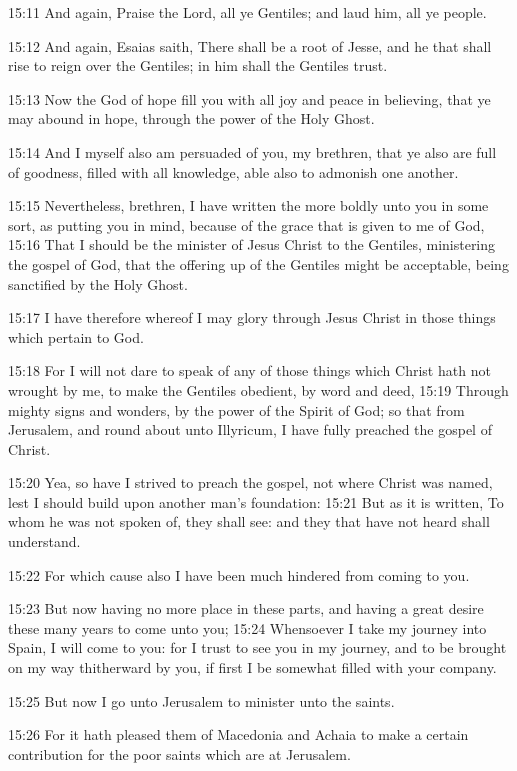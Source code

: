 15:11 And again, Praise the Lord, all ye Gentiles; and laud him, all
ye people.

15:12 And again, Esaias saith, There shall be a root of Jesse, and he
that shall rise to reign over the Gentiles; in him shall the Gentiles
trust.

15:13 Now the God of hope fill you with all joy and peace in
believing, that ye may abound in hope, through the power of the Holy
Ghost.

15:14 And I myself also am persuaded of you, my brethren, that ye also
are full of goodness, filled with all knowledge, able also to admonish
one another.

15:15 Nevertheless, brethren, I have written the more boldly unto you
in some sort, as putting you in mind, because of the grace that is
given to me of God, 15:16 That I should be the minister of Jesus
Christ to the Gentiles, ministering the gospel of God, that the
offering up of the Gentiles might be acceptable, being sanctified by
the Holy Ghost.

15:17 I have therefore whereof I may glory through Jesus Christ in
those things which pertain to God.

15:18 For I will not dare to speak of any of those things which Christ
hath not wrought by me, to make the Gentiles obedient, by word and
deed, 15:19 Through mighty signs and wonders, by the power of the
Spirit of God; so that from Jerusalem, and round about unto Illyricum,
I have fully preached the gospel of Christ.

15:20 Yea, so have I strived to preach the gospel, not where Christ
was named, lest I should build upon another man's foundation: 15:21
But as it is written, To whom he was not spoken of, they shall see:
and they that have not heard shall understand.

15:22 For which cause also I have been much hindered from coming to
you.

15:23 But now having no more place in these parts, and having a great
desire these many years to come unto you; 15:24 Whensoever I take my
journey into Spain, I will come to you: for I trust to see you in my
journey, and to be brought on my way thitherward by you, if first I be
somewhat filled with your company.

15:25 But now I go unto Jerusalem to minister unto the saints.

15:26 For it hath pleased them of Macedonia and Achaia to make a
certain contribution for the poor saints which are at Jerusalem.

